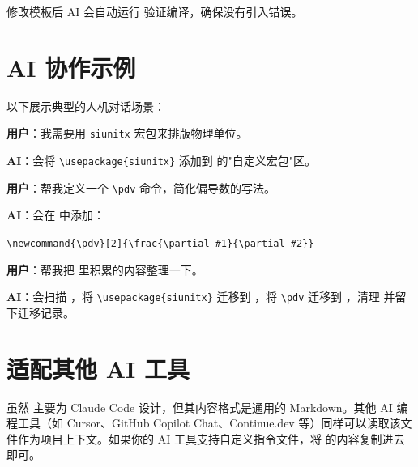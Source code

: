 \documentclass[../main-manual.tex]{subfiles}
\begin{document}
修改模板后 AI 会自动运行  验证编译，确保没有引入错误。

\section{AI 协作示例}

以下展示典型的人机对话场景：

\begin{tcolorbox}[
	colback=blue!3!white,
	colframe=blue!30!white,
	title={\centering 对话示例}
]
\textbf{用户}：我需要用 \texttt{siunitx} 宏包来排版物理单位。\par
\textbf{AI}：会将 \verb|\usepackage{siunitx}| 添加到  的"自定义宏包"区。\par\medskip

\textbf{用户}：帮我定义一个 \verb|\pdv| 命令，简化偏导数的写法。\par
\textbf{AI}：会在  中添加：\par
\verb|\newcommand{\pdv}[2]{\frac{\partial #1}{\partial #2}}|\par\medskip

\textbf{用户}：帮我把  里积累的内容整理一下。\par
\textbf{AI}：会扫描 ，将 \verb|\usepackage{siunitx}| 迁移到 ，将 \verb|\pdv| 迁移到 ，清理  并留下迁移记录。
\end{tcolorbox}

\section{适配其他 AI 工具}

虽然  主要为 Claude Code 设计，但其内容格式是通用的 Markdown。其他 AI 编程工具（如 Cursor、GitHub Copilot Chat、Continue.dev 等）同样可以读取该文件作为项目上下文。如果你的 AI 工具支持自定义指令文件，将  的内容复制进去即可。
\end{document}
